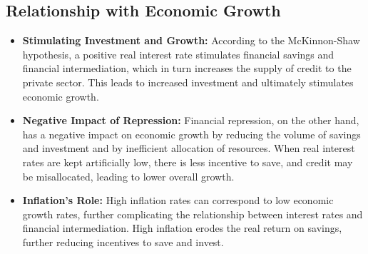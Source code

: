 \subsection{Relationship with Economic Growth}
\begin{itemize}
    \item \textbf{Stimulating Investment and Growth:} According to the McKinnon-Shaw hypothesis, a positive real interest rate stimulates financial savings and financial intermediation, which in turn increases the supply of credit to the private sector. This leads to increased investment and ultimately stimulates economic growth.
    \item \textbf{Negative Impact of Repression:} Financial repression, on the other hand, has a negative impact on economic growth by reducing the volume of savings and investment and by inefficient allocation of resources. When real interest rates are kept artificially low, there is less incentive to save, and credit may be misallocated, leading to lower overall growth.
    \item \textbf{Inflation's Role:} High inflation rates can correspond to low economic growth rates, further complicating the relationship between interest rates and financial intermediation. High inflation erodes the real return on savings, further reducing incentives to save and invest.
\end{itemize}
